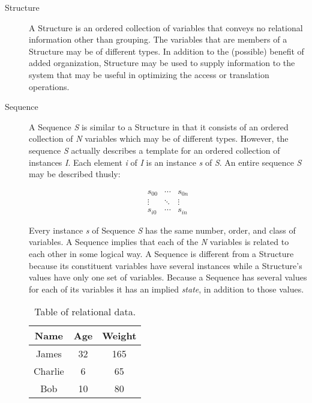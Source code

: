\begin{description}
  
\item[Structure] A Structure is an ordered collection of variables that
  conveys no relational information other than grouping. The variables that
  are members of a Structure may be of different types. In addition to the
  (possible) benefit of added organization, Structure may be used to supply
  information to the system that may be useful in optimizing the access or
  translation operations.

\item[Sequence]
  
  A Sequence {\em S\/} is similar to a Structure in that it consists of an
  ordered collection of {\em N\/} variables which may be of different types.
  However, the sequence {\em S\/} actually describes a template for an
  ordered collection of instances {\em I\/}. Each element {\em i\/} of {\em
    I\/} is an instance {\em s\/} of {\em S\/}. An entire sequence {\em S\/}
  may be described thusly:

\begin{displaymath} 
\begin{array}{ccc}  
        s_{0 0} & \cdots & s_{0 n} \\  
        \vdots & \ddots & \vdots \\  
        s_{i 0} & \cdots & s_{i n}
\end{array} 
\end{displaymath}

\noindent Every instance {\em s\/} of Sequence {\em S\/} has the same number,
order, and class of variables. A Sequence implies that each of the {\em N\/}
variables is related to each other in some logical way. A Sequence is
different from a Structure because its constituent variables have several
instances while a Structure's values have only one set of variables. Because
a Sequence has several values for each of its variables it has an implied
{\em state}, in addition to those values.

\begin{table} 
\caption{Table of relational data.}
\label{toolkit:seq2} 
\begin{center} 
\begin{tabular}{|| c | c | c ||} \hline 
{\sc Name} & {\sc Age} & {\sc Weight} \\ \hline 
James & 32 & 165 \\ 
Charlie & 6 & 65 \\ 
Bob & 10 & 80 \\ \hline
\end{tabular} 
\end{center} 
\end{table}


\end{description}

